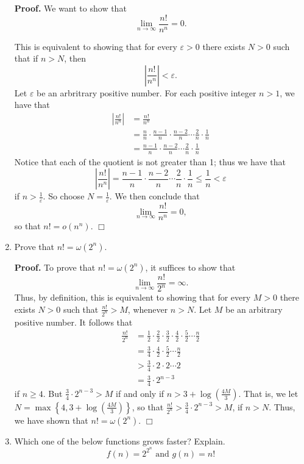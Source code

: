 \documentclass[9pt]{article}
\newcommand{\qed}{\hfill \ensuremath{\Box}}
\begin{document}
\begin{enumerate}
      \textbf{Proof.} We want to show that
      $$\lim_{n \rightarrow \infty} \frac{n!}{n^n} = 0.$$
   
      This is equivalent to showing that for every $\varepsilon > 0$ there
      exists $N > 0$ such that if $n > N$, then
      $$\left|\frac{n!}{n^n}\right| < \varepsilon.$$
      Let $\varepsilon$ be an arbritrary positive number. For each positive
      integer $n > 1$, we have that
      \begin{align*}
         \left|\frac{n!}{n^n}\right| &= \frac{n!}{n^n} \\
            &= \frac{n}{n} \cdot \frac{n-1}{n} \cdot \frac{n-2}{n} \cdots
               \frac{2}{n} \cdot \frac{1}{n} \\
            &= \frac{n-1}{n} \cdot \frac{n-2}{n} \cdots
               \frac{2}{n} \cdot \frac{1}{n}
      \end{align*}
      Notice that each of the quotient is not greater than 1; thus we have
      that
      $$\left|\frac{n!}{n^n}\right| = \frac{n-1}{n} \cdot \frac{n-2}{n} \cdots
        \frac{2}{n} \cdot \frac{1}{n} \le \frac{1}{n} < \varepsilon$$
      if $n > \frac{1}{\varepsilon}$. So choose $N = \frac{1}{\varepsilon}$. We
      then conclude that
      $$\lim_{n \rightarrow \infty} \frac{n!}{n^n} = 0,$$
      so that $n! = o(n^n)$. \qed
   \item Prove that $n! = \omega(2^n)$.

      \textbf{Proof.} To prove that $n! = \omega(2^n)$, it suffices to show that
      $$\lim_{n \rightarrow \infty} \frac{n!}{2^n} = \infty.$$
      Thus, by definition, this is equivalent to showing that for every $M > 0$
      there exists $N > 0$ such that $\frac{n!}{2^n} > M$, whenever $n > N$. Let
      $M$ be an arbitrary positive number. It follows that
      \begin{align*}
         \frac{n!}{2^n} &= \frac{1}{2}\cdot\frac{2}{2}\cdot\frac{3}{2}\cdot
         \frac{4}{2}\cdot\frac{5}{2}\cdots\frac{n}{2} \\
         &= \frac{3}{4} \cdot \frac{4}{2}\cdot\frac{5}{2}\cdots\frac{n}{2} \\
         &> \frac{3}{4} \cdot 2 \cdot 2 \cdots 2 \\
         &= \frac{3}{4} \cdot 2^{n-3}
      \end{align*}
      if $n \ge 4$. But $\frac{3}{4} \cdot 2^{n-3} > M$ if and only if
      $n > 3 + \log\left(\frac{4M}{3}\right)$. That is, we let
      $N = \max\left\{4, 3 + \log\left(\frac{4M}{3}\right)\right\}$, so that
      $\frac{n!}{2^n} > \frac{3}{4} \cdot 2^{n-3} > M$, if $n > N$. Thus, we
      have shown that $n! = \omega(2^n)$. \qed
   \item Which one of the below functions grows faster? Explain.
         $$f(n) = 2^{2^n} \text{ and } g(n) = n!$$


\end{enumerate}
\end{document}

